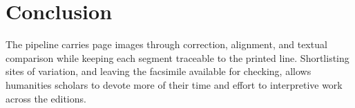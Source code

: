 \documentclass[sigconf,natbib,anonymous]{acmart}
\begin{document}
\section{Conclusion}

The pipeline carries page images through correction, alignment, and textual comparison while keeping each segment traceable to the printed line.
Shortlisting sites of variation, and leaving the facsimile available for checking, allows humanities scholars to devote more of their time and effort to interpretive work across the editions.

\begingroup
\setlength{\bibsep}{0pt plus 0.3\baselineskip}


\endgroup
\end{document}
